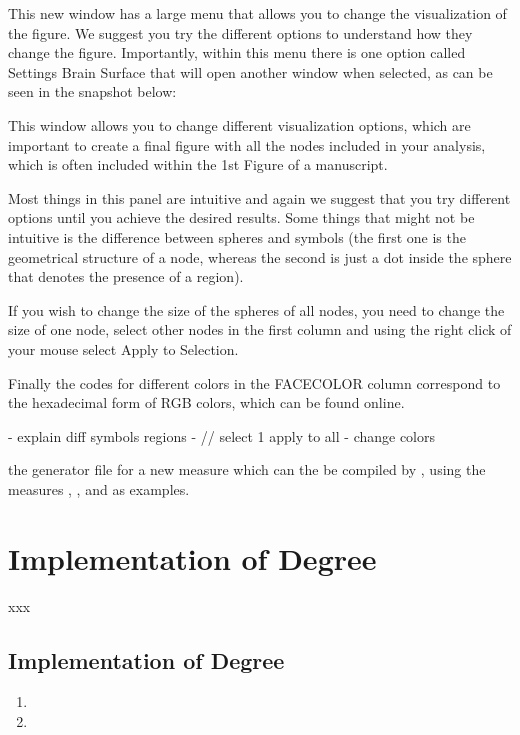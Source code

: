 \documentclass{tufte-handout}
\begin{document}
This new window has a large menu that allows you to change the visualization of the figure. We suggest you try the different options to understand how they change the figure. Importantly, within this menu there is one option called Settings Brain Surface that will open another window when selected, as can be seen in the snapshot below:


This window allows you to change different visualization options, which are important to create a final figure with all the nodes included in your analysis, which is often included within the 1st Figure of a manuscript.


Most things in this panel are intuitive and again we suggest that you try different options until you achieve the desired results. Some things that might not be intuitive is the difference between spheres and symbols (the first one is the geometrical structure of a node, whereas the second is just a dot inside the sphere that denotes the presence of a region). 


If you wish to change the size of the spheres of all nodes, you need to change the size of one node, select other nodes in the first column and using the right click of your mouse select Apply to Selection.


Finally the codes for different colors in the FACECOLOR column correspond to the hexadecimal form of RGB colors, which can be found online.




 - explain diff symbols regions
 - // select 1 apply to all
 - change colors
 

the generator file  for a new measure which can the be compiled by , using the measures , , and  as examples.

\tableofcontents

\clearpage
\section{Implementation of Degree}

xxx

\subsection{Implementation of Degree}

\begin{enumerate}
\item
\item
\end{enumerate}

%
%
\end{document}
